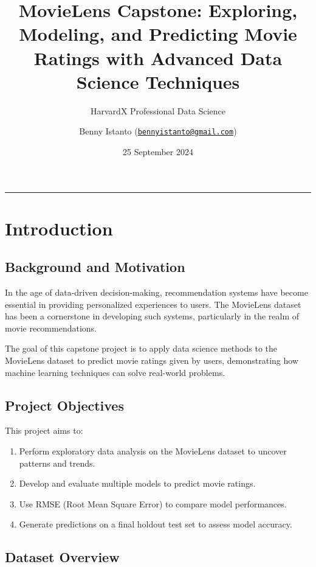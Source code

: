 \documentclass[
]{article}
\title{MovieLens Capstone: Exploring, Modeling, and Predicting Movie
Ratings with Advanced Data Science Techniques}
\subtitle{HarvardX Professional Data Science}
\author{Benny Istanto
(\href{mailto:bennyistanto@gmail.com}{\nolinkurl{bennyistanto@gmail.com}})}
\date{25 September 2024}
\providecommand{\tightlist}{%
  \setlength{\itemsep}{0pt}\setlength{\parskip}{0pt}}
\begin{document}
\maketitle

{
\setcounter{tocdepth}{2}
\tableofcontents
}
\begin{center}\rule{0.5\linewidth}{0.5pt}\end{center}

\section{Introduction}\label{introduction}

\subsection{Background and Motivation}\label{background-and-motivation}

In the age of data-driven decision-making, recommendation systems have
become essential in providing personalized experiences to users. The
MovieLens dataset has been a cornerstone in developing such systems,
particularly in the realm of movie recommendations.

The goal of this capstone project is to apply data science methods to
the MovieLens dataset to predict movie ratings given by users,
demonstrating how machine learning techniques can solve real-world
problems.

\subsection{Project Objectives}\label{project-objectives}

This project aims to:

\begin{enumerate}
\def\labelenumi{\arabic{enumi}.}
\tightlist
\item
  Perform exploratory data analysis on the MovieLens dataset to uncover
  patterns and trends.
\item
  Develop and evaluate multiple models to predict movie ratings.
\item
  Use RMSE (Root Mean Square Error) to compare model performances.
\item
  Generate predictions on a final holdout test set to assess model
  accuracy.
\end{enumerate}

\subsection{Dataset Overview}\label{dataset-overview}
\end{document}
